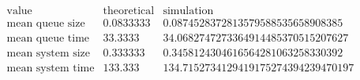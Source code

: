 \[\begin{array}{cccc}
 \text{value} & \text{theoretical} & \text{simulation} & \text{} \\
 \text{mean queue size} & 0.0833333 & 0.0874528372813579588535658908385 & \text{} \\
 \text{mean queue time} & 33.3333 & 34.0682747273364914485370515207627 & \text{} \\
 \text{mean system size} & 0.333333 & 0.3458124304616564281063258330392 & \text{} \\
 \text{mean system time} & 133.333 & 134.7152734129419175274394239470197 & \text{} \\
\end{array}\]

